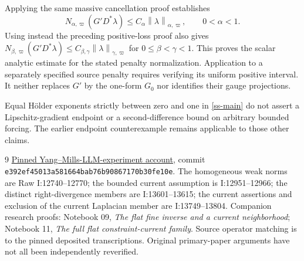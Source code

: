 \documentclass[11pt]{article}
\theoremstyle{remark}
\newcommand{\norm}[1]{\left\|#1\right\|}
\begin{document}
Applying the same massive cancellation proof establishes
\begin{equation}\label{ss-scalar-right-divergence}
 N_{\alpha,\varpi}(G'D^*\lambda)
       \le C_\alpha\norm{\lambda}_{\alpha,\varpi},
                       \qquad0<\alpha<1.
\end{equation}
Using instead the preceding positive-loss proof also gives
$N_{\beta,\varpi}(G'D^*\lambda)
\le C_{\beta,\gamma}\norm{\lambda}_{\gamma,\varpi}$ for
$0\le\beta<\gamma<1$. This proves the scalar analytic estimate
for the stated penalty normalization. Application to a separately
specified source penalty requires verifying its uniform positive
interval. It neither replaces $G'$ by the one-form $G_0$ nor
identifies their gauge projections.

Equal H\"older exponents strictly between zero and one in
\eqref{ss-main} do not assert a Lipschitz-gradient endpoint or a
second-difference bound on arbitrary bounded forcing. The earlier
endpoint counterexample remains applicable to those other claims.

\begin{thebibliography}{9}
\href{https://github.com/ethanwsussman/Yang--Mills-LLM-experiment/tree/e392ef45013a581664bab76b90867170b30fe10e}
{Pinned Yang--Mills-LLM-experiment account}, commit
\texttt{e392ef4501\allowbreak 3a581664ba\allowbreak b76b908671\allowbreak 70b30fe10e}.
The homogeneous weak norms are Raw I:12740--12770; the bounded
current assumption is I:12951--12966; the distinct right-divergence
members are I:13601--13615; the current assertions and exclusion of
the current Laplacian member are I:13749--13804.
Companion research proofs: Notebook 09, \emph{The flat fine inverse
and a current neighborhood}; Notebook 11, \emph{The full flat
constraint-current family}. Source operator matching is to the pinned
deposited transcriptions. Original primary-paper arguments have not
all been independently reverified.
\end{thebibliography}
\end{document}
